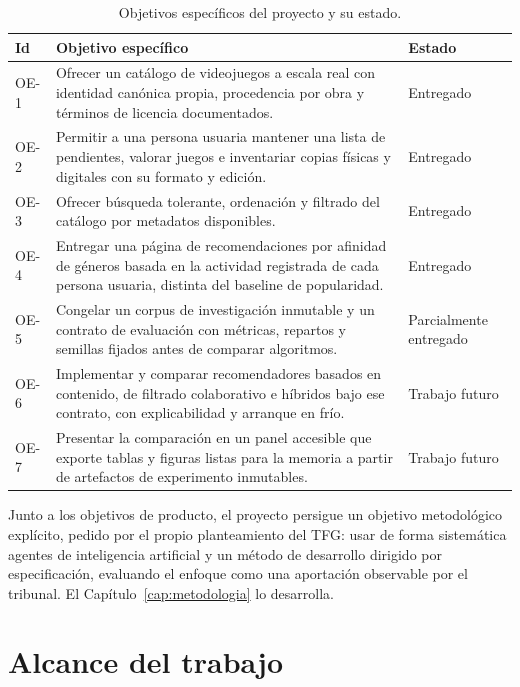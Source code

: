 \begin{table}[htp]
\centering
\begin{tabularx}{\textwidth}{ | Z | Y | Z | }
    \hline
    \textbf{Id} & \textbf{Objetivo específico} & \textbf{Estado} \\
    \hline
    OE-1 & Ofrecer un catálogo de videojuegos a escala real con identidad canónica propia, procedencia por obra y términos de licencia documentados. & Entregado \\
    \hline
    OE-2 & Permitir a una persona usuaria mantener una lista de pendientes, valorar juegos e inventariar copias físicas y digitales con su formato y edición. & Entregado \\
    \hline
    OE-3 & Ofrecer búsqueda tolerante, ordenación y filtrado del catálogo por metadatos disponibles. & Entregado \\
    \hline
    OE-4 & Entregar una página de recomendaciones por afinidad de géneros basada en la actividad registrada de cada persona usuaria, distinta del baseline de popularidad. & Entregado \\
    \hline
    OE-5 & Congelar un corpus de investigación inmutable y un contrato de evaluación con métricas, repartos y semillas fijados antes de comparar algoritmos. & Parcialmente entregado \\
    \hline
    OE-6 & Implementar y comparar recomendadores basados en contenido, de filtrado colaborativo e híbridos bajo ese contrato, con explicabilidad y arranque en frío. & Trabajo futuro \\
    \hline
    OE-7 & Presentar la comparación en un panel accesible que exporte tablas y figuras listas para la memoria a partir de artefactos de experimento inmutables. & Trabajo futuro \\
    \hline
\end{tabularx}
\caption{Objetivos específicos del proyecto y su estado.}
\label{tab:objetivos-especificos}
\end{table}

Junto a los objetivos de producto, el proyecto persigue un objetivo metodológico explícito,
pedido por el propio planteamiento del TFG: usar de forma sistemática agentes de inteligencia
artificial y un método de desarrollo dirigido por especificación, evaluando el enfoque como
una aportación observable por el tribunal. El Capítulo~\ref{cap:metodologia} lo desarrolla.

\section{Alcance del trabajo}\label{sec:intro-alcance}

